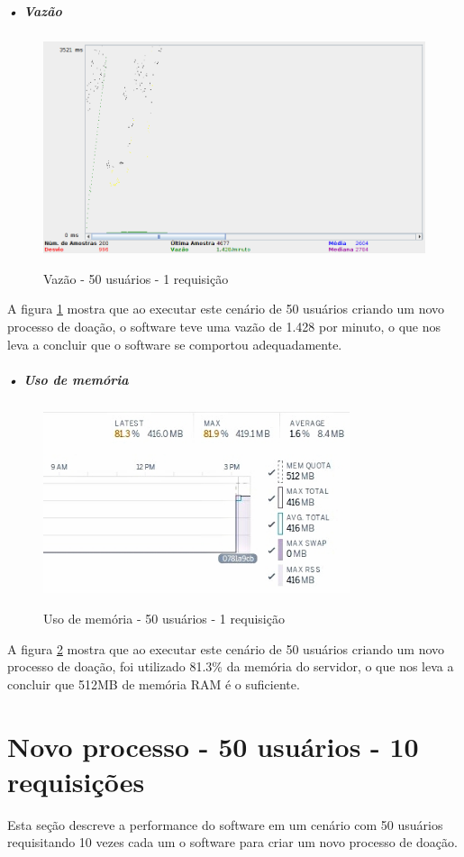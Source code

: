 \documentclass[portuguese,oneside]{tcc}
\begin{document}
\newpage

\subparagraph{• Vazão}
\begin{figure}[htp]
\centering
\caption{Vazão - 50 usuários - 1 requisição}
\includegraphics[width=15cm]{50-1-throughput}
\label{fig:throughput-50-1}
\end{figure}

A figura \ref{fig:throughput-50-1} mostra que ao executar este cenário de 50 usuários criando um novo processo de doação, o software teve uma vazão de 1.428 por minuto, o que nos leva a concluir que o software se comportou adequadamente.

\subparagraph{• Uso de memória}
\begin{figure}[htp]
\centering
\caption{Uso de memória - 50 usuários - 1 requisição}
\includegraphics[width=9cm]{50-1-memory}
\label{fig:uso-de-memoria-50-1}
\end{figure}

A figura \ref{fig:uso-de-memoria-50-1} mostra que ao executar este cenário de 50 usuários criando um novo processo de doação, foi utilizado 81.3\% da memória do servidor, o que nos leva a concluir que 512MB de memória RAM é o suficiente.

\section{Novo processo - 50 usuários - 10 requisições}
Esta seção descreve a performance do software em um cenário com 50 usuários requisitando 10 vezes cada um o software para criar um novo processo de doação.
\end{document}

